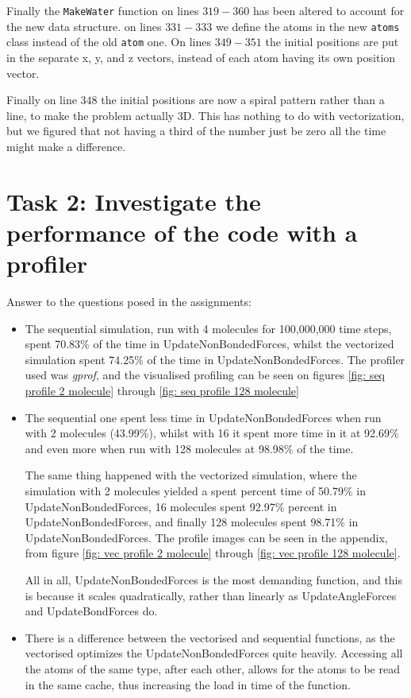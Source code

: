 \documentclass{article}
\begin{document}
Finally the \texttt{MakeWater} function on lines $319-360$ has been altered to account for the new data structure. on lines $331-333$ we define the atoms in the new \texttt{atoms} class instead of the old \texttt{atom} one. On lines $349-351$ the initial positions are put in the separate x, y, and z vectors, instead of each atom having its own position vector. 

Finally on line $348$ the initial positions are now a spiral pattern rather than a line, to make the problem actually 3D. This has nothing to do with vectorization, but we figured that not having a third of the number just be zero all the time might make a difference.

\section{Task 2: Investigate the performance of the code with a profiler}
Answer to the questions posed in the assignments:
\begin{itemize}
    \item The sequential simulation, run with 4 molecules for 100,000,000 time steps, spent 70.83\% of the time in UpdateNonBondedForces, whilst the vectorized simulation spent 74.25\% of the time in UpdateNonBondedForces. The profiler used was \textit{gprof}, and the visualised profiling can be seen on figures \ref{fig: seq profile 2 molecule} through \ref{fig: seq profile 128 molecule}
    \item The sequential one spent less time in UpdateNonBondedForces when run with 2 molecules (43.99\%), whilst with 16 it spent more time in it at 92.69\% and even more when run with 128 molecules at 98.98\% of the time.
    
    The same thing happened with the vectorized simulation, where the simulation with 2 molecules yielded a spent percent time of 50.79\%
    in UpdateNonBondedForces, 16 molecules spent 92.97\%
    percent in UpdateNonBondedForces, and finally 128 molecules spent 98.71\% 
    in UpdateNonBondedForces. The profile images can be seen in the appendix, from figure \ref{fig: vec profile 2 molecule} through \ref{fig: vec profile 128 molecule}.

    All in all, UpdateNonBondedForces is the most demanding function, and this is because it scales quadratically, rather than linearly as UpdateAngleForces and UpdateBondForces do.

    \item There is a difference between the vectorised and sequential functions, as the vectorised optimizes the UpdateNonBondedForces quite heavily. Accessing all the atoms of the same type, after each other, allows for the atoms to be read in the same cache, thus increasing the load in time of the function.
\end{itemize}
\end{document}
